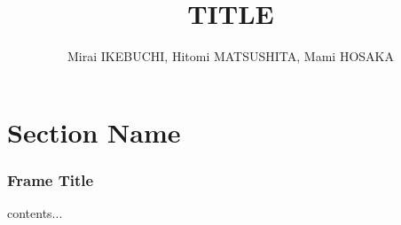 \documentclass{beamer}
\title{TITLE}
\author{Mirai IKEBUCHI, Hitomi MATSUSHITA, Mami HOSAKA}
\date{}
\begin{document}
\frame{\titlepage}

\section{Section Name}

\begin{frame}
	\frametitle{Frame Title}
	contents...
\end{frame}
\end{document}
